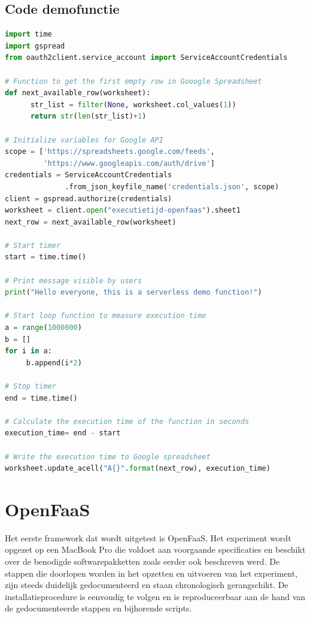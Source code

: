 \newpage
\subsection{Code demofunctie}
\begin{lstlisting}[language=python]
import time
import gspread
from oauth2client.service_account import ServiceAccountCredentials

# Function to get the first empty row in Gooogle Spreadsheet
def next_available_row(worksheet):
      str_list = filter(None, worksheet.col_values(1)) 
      return str(len(str_list)+1)

# Initialize variables for Google API
scope = ['https://spreadsheets.google.com/feeds',
         'https://www.googleapis.com/auth/drive']
credentials = ServiceAccountCredentials
              .from_json_keyfile_name('credentials.json', scope)
client = gspread.authorize(credentials)
worksheet = client.open("executietijd-openfaas").sheet1
next_row = next_available_row(worksheet)

# Start timer 
start = time.time()

# Print message visible by users
print("Hello everyone, this is a serverless demo function!")

# Start loop function to measure execution time
a = range(1000000)
b = []
for i in a:
     b.append(i*2)

# Stop timer
end = time.time()

# Calculate the execution time of the function in seconds
execution_time= end - start

# Write the execution time to Google spreadsheet
worksheet.update_acell("A{}".format(next_row), execution_time)
\end{lstlisting}


\section{OpenFaaS}
Het eerste framework dat wordt uitgetest is OpenFaaS. Het experiment wordt opgezet op een MacBook Pro die voldoet aan voorgaande specificaties en beschikt over de benodigde softwarepakketten zoals eerder ook beschreven werd. De stappen die doorlopen worden in het opzetten en uitvoeren van het experiment, zijn steeds duidelijk gedocumenteerd en staan chronologisch gerangschikt. De installatieprocedure is eenvoudig te volgen en is reproduceerbaar aan de hand van de gedocumenteerde stappen en bijhorende scripts.

